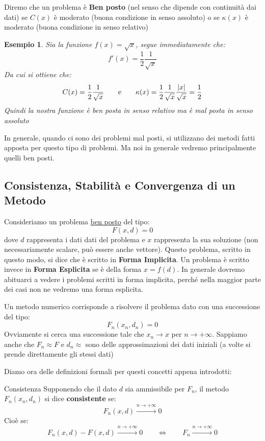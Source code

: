 \documentclass[11pt,a4paper,twoside]{article}
\newtheorem{es}{Esempio}
\theoremstyle{definition}
\begin{document}
Diremo che un problema è \textbf{Ben posto} (nel senso che dipende con continuità dai dati) se $C(x)$ è moderato (buona condizione in senso assoluto) o se $\kappa(x)$ è moderato (buona condizione in senso relativo)

\begin{es}
	Sia la funzione $f(x) = \sqrt x$, segue immediatamente che:
	\[ f'(x) = \frac 12 \frac 1{\sqrt x}\]
	Da cui si ottiene che:
	\[C(x) = \frac 12 \frac{1}{\sqrt x}\qquad \text e \qquad \kappa(x) = \frac 12 \frac 1{\sqrt x}\frac {|x|}{\sqrt x} = \frac 12\]
	Quindi la nostra funzione è ben posta in senso relativo ma è mal posta in senso assoluto
\end{es}

In generale, quando ci sono dei problemi mal posti, si utilizzano dei metodi fatti apposta per questo tipo di problemi. Ma noi in generale vedremo principalmente quelli ben posti.

\subsection{Consistenza, Stabilità e Convergenza di un Metodo}

Consideriamo un problema \underline{ben posto} del tipo:
\[F(x, d) = 0\]
dove $d$ rappresenta i dati dati del problema e $x$ rappresenta la sua soluzione (non necessariamente scalare, può essere anche vettore). Questo problema, scritto in questo modo, si dice che è scritto in \textbf{Forma Implicita}. Un problema è scritto invece in \textbf{Forma Esplicita} se è della forma $x = f(d)$. In generale dovremo abituarci a vedere i problemi scritti in forma implicita, perché nella maggior parte dei casi non ne vedremo una forma esplicita.

Un metodo numerico corrisponde a risolvere il problema dato con una successione del tipo:
\[ F_n(x_n, d_n) = 0\]
Ovviamente si cerca una successione tale che $x_n \to x$ per $n \to +\infty$. Sappiamo anche che $F_n \approx F$ e $d_n \approx$ sono delle approssimazioni dei dati iniziali (a volte si prende direttamente gli stessi dati)

Diamo ora delle definizioni formali per questi concetti appena introdotti:

\begin{defn}{Consistenza}{}
	Supponendo che il dato $d$ sia ammissibile per $F_n$, il metodo $F_n(x_n, d_n)$ si dice \textbf{consistente} se: \[F_n(x,d) \xrightarrow{n \to + \infty} 0\]
	Cioè se:
	\[ F_n(x, d) - F(x, d) \xrightarrow{n \to +\infty}0\qquad \Leftrightarrow \qquad F_n \xrightarrow{n \to +\infty} 0 \]
\end{defn}
\end{document}
